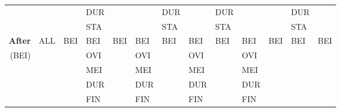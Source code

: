 \documentclass[11pt]{report}
\newenvironment{vvarmargin}[2]
{
  \begin{list}{}
  {
    \setlength{\topsep}{0pt}
    \setlength{\leftmargin}{0pt}
    \setlength{\rightmargin}{0pt}
    \setlength{\listparindent}{\parindent}
    \setlength{\itemindent}{\parindent}
    \setlength{\parsep}{0pt plus 1pt}
    \addtolength{\leftmargin}{#1}\addtolength{\rightmargin}{#2}
  }
  \item
}
{
  \end{list}
}
\begin{document}
\begin{table}[p]
\begin{vvarmargin}{-4cm}{-4cm}
\begin{center}
\begin{tabular}[t]{|r|l|l|l|l|l|l|l|l|l|l|l|l|}
                                          &                         &                         & DUR                     &                         &                         & DUR                     &                         & DUR                     &                         &                         & DUR                     &                         \\
                                          &                         &                         & STA                     &                         &                         & STA                     &                         & STA                     &                         &                         & STA                     &                         \\
                  \hline
                  \textbf{After}          & ALL                     & BEI                     & BEI                     & BEI                     & BEI                     & BEI                     & BEI                     & BEI                     & BEI                     & BEI                     & BEI                     & BEI                     \\
                  (BEI)                   &                         &                         & OVI                     &                         & OVI                     &                         & OVI                     &                         & OVI                     &                         &                         &                         \\
                                          &                         &                         & MEI                     &                         & MEI                     &                         & MEI                     &                         & MEI                     &                         &                         &                         \\
                                          &                         &                         & DUR                     &                         & DUR                     &                         & DUR                     &                         & DUR                     &                         &                         &                         \\
                                          &                         &                         & FIN                     &                         & FIN                     &                         & FIN                     &                         & FIN                     &                         &                         &                         \\

\end{tabular}
\end{center}
\end{vvarmargin}
\end{table}
\end{document}
